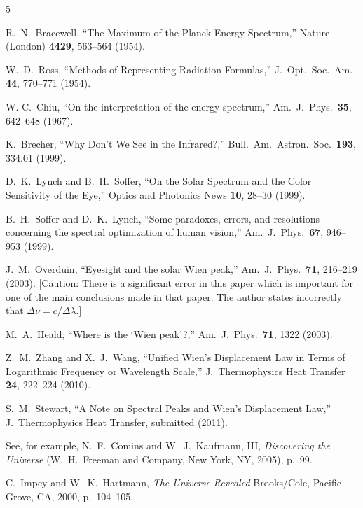 \documentclass[12pt,aps,prb,preprint]{revtex4}   %
\begin{document}
\begin{thebibliography}{5}

 R.\ N.\ Bracewell, ``The Maximum of the Planck Energy Spectrum,'' Nature (London) {\bf 4429}, 563--564 (1954). %

W.\ D.\ Ross, ``Methods of Representing Radiation Formulas,'' J.\ Opt.\ Soc.\ Am. {\bf 44}, 770--771 (1954).

W.-C.\ Chiu, ``On the interpretation of the energy spectrum,'' Am.\ J.\ Phys.\ {\bf 35}, 642--648 (1967).

K.\ Brecher, ``Why Don't We See in the Infrared?,'' Bull.\ Am.\ Astron.\ Soc.\ {\bf 193}, 334.01 (1999).

D.\ K.\ Lynch and B.\ H.\ Soffer, ``On the Solar Spectrum and the Color Sensitivity of the Eye,'' Optics and Photonics News {\bf 10}, 28--30 (1999).

B.\ H.\ Soffer and D.\ K.\ Lynch, ``Some paradoxes, errors, and resolutions concerning the spectral optimization of human vision,'' Am.\ J.\ Phys.\ {\bf 67}, 946--953 (1999).

J.\ M.\ Overduin, ``Eyesight and the solar Wien peak,''  Am.\ J.\ Phys.\ {\bf 71}, 216--219 (2003). [Caution:  There is a significant error in this paper which is important for one of the main conclusions made in that paper.  The author states incorrectly that $\Delta\nu = c / \Delta\lambda$.]

M.\ A.\ Heald, ``Where is the `Wien peak'?,'' Am.\ J.\ Phys.\ {\bf 71}, 1322 (2003).

 Z.\ M.\ Zhang and X.\ J.\ Wang, ``Unified Wien's Displacement Law in Terms of Logarithmic Frequency or Wavelength Scale,'' J.\ Thermophysics Heat Transfer {\bf 24}, 222--224 (2010).

S.\ M.\ Stewart, ``A Note on Spectral Peaks and Wien's Displacement Law,'' J.\ Thermophysics Heat Transfer, submitted (2011).

See, for example, N.\ F.\ Comins and W.\ J.\ Kaufmann, III, \textsl{Discovering the Universe} (W.\ H.\ Freeman and Company, New York, NY, 2005), p.\ 99.

C.\ Impey and W.\ K.\ Hartmann, \textsl{The Universe Revealed} {Brooks/Cole, Pacific Grove, CA, 2000}, p.\ 104--105.


\end{thebibliography}
\end{document}
